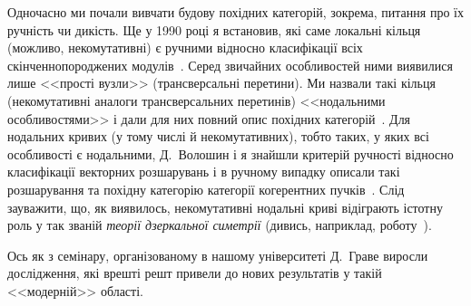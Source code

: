 Одночасно ми почали вивчати будову похідних категорій, зокрема, питання про їх ручність чи дикість. 
Ще у 1990 році я встановив, які саме локальні кільця (можливо, некомутативні) є ручними відносно класифікації всіх скінченнопороджених модулів~\cite{pure}.
Серед звичайних особливостей ними виявилися лише <<прості вузли>> (трансверсальні перетини). 
Ми назвали такі кільця (некомутативні аналоги трансверсальних перетинів) <<нодальними особливостями>> і дали для них повний опис похідних категорій~\cite{BDnodal}. 
Для нодальних кривих (у тому числі й некомутативних), тобто таких, у яких всі особливості є нодальними, Д.~Волошин і я знайшли критерій ручності відносно класифікації векторних розшарувань і в ручному випадку описали такі розшарування та похідну категорію категорії когерентних пучків~\cite{DVol1,DVol2}. 
Слід зауважити, що, як виявилось, некомутативні нодальні криві відіграють істотну роль у так званій \emph{теорії дзеркальної симетрії} (дивись, наприклад, роботу~\cite{LP}).

Ось як з семінару, організованому в нашому університеті Д.~Граве виросли дослідження, які врешті решт привели до нових результатів у такій <<модерній>> області.

